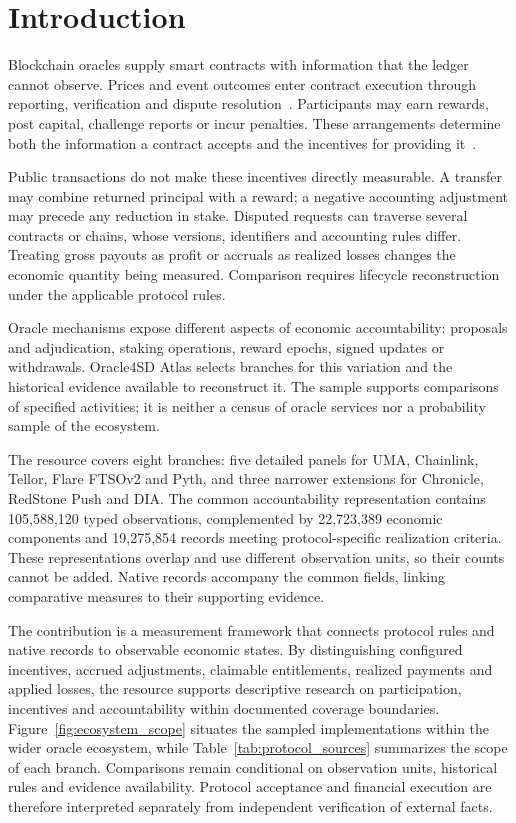 \section{Introduction}

Blockchain oracles supply smart contracts with information that the ledger cannot observe. Prices and event outcomes enter contract execution through reporting, verification and dispute resolution~\cite{zhang2016towncrier,eskandari2021sok}. Participants may earn rewards, post capital, challenge reports or incur penalties. These arrangements determine both the information a contract accepts and the incentives for providing it~\cite{cong2019blockchain,cong2025oracleprimer}.

Public transactions do not make these incentives directly measurable. A transfer may combine returned principal with a reward; a negative accounting adjustment may precede any reduction in stake. Disputed requests can traverse several contracts or chains, whose versions, identifiers and accounting rules differ. Treating gross payouts as profit or accruals as realized losses changes the economic quantity being measured. Comparison requires lifecycle reconstruction under the applicable protocol rules.

Oracle mechanisms expose different aspects of economic accountability: proposals and adjudication, staking operations, reward epochs, signed updates or withdrawals. Oracle4SD Atlas selects branches for this variation and the historical evidence available to reconstruct it. The sample supports comparisons of specified activities; it is neither a census of oracle services nor a probability sample of the ecosystem.

The resource covers eight branches: five detailed panels for UMA, Chainlink, Tellor, Flare FTSOv2 and Pyth, and three narrower extensions for Chronicle, RedStone Push and DIA. The common accountability representation contains 105,588,120 typed observations, complemented by 22,723,389 economic components and 19,275,854 records meeting protocol-specific realization criteria. These representations overlap and use different observation units, so their counts cannot be added. Native records accompany the common fields, linking comparative measures to their supporting evidence.

The contribution is a measurement framework that connects protocol rules and native records to observable economic states. By distinguishing configured incentives, accrued adjustments, claimable entitlements, realized payments and applied losses, the resource supports descriptive research on participation, incentives and accountability within documented coverage boundaries. Figure~\ref{fig:ecosystem_scope} situates the sampled implementations within the wider oracle ecosystem, while Table~\ref{tab:protocol_sources} summarizes the scope of each branch. Comparisons remain conditional on observation units, historical rules and evidence availability. Protocol acceptance and financial execution are therefore interpreted separately from independent verification of external facts.

